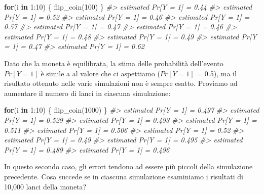 \documentclass[
  11pt,
]{krantz}
\makeatletter
\newenvironment{Shaded}{\begin{snugshade}}{\end{snugshade}}
\newcommand{\CommentTok}[1]{\textcolor[rgb]{0.37,0.37,0.37}{\textit{#1}}}
\newcommand{\ControlFlowTok}[1]{\textcolor[rgb]{0.27,0.27,0.27}{\textbf{#1}}}
\newcommand{\DecValTok}[1]{\textcolor[rgb]{0.06,0.06,0.06}{#1}}
\newcommand{\FunctionTok}[1]{\textcolor[rgb]{0,0,0}{#1}}
\newcommand{\NormalTok}[1]{#1}
\newcommand{\SpecialCharTok}[1]{\textcolor[rgb]{0,0,0}{#1}}
\newenvironment{kframe}{%
\medskip{}
\setlength{\fboxsep}{.8em}
 \def\at@end@of@kframe{}%
 \ifinner\ifhmode%
  \def\at@end@of@kframe{\end{minipage}}%
  \begin{minipage}{\columnwidth}%
 \fi\fi%
 \def\FrameCommand##1{\hskip\@totalleftmargin \hskip-\fboxsep
 \colorbox{shadecolor}{##1}\hskip-\fboxsep
     \hskip-\linewidth \hskip-\@totalleftmargin \hskip\columnwidth}%
 \MakeFramed {\advance\hsize-\width
   \@totalleftmargin\z@ \linewidth\hsize
   \@setminipage}}%
 {\par\unskip\endMakeFramed%
 \at@end@of@kframe}
\renewenvironment{Shaded}{\begin{kframe}}{\end{kframe}}
\theoremstyle{definition}
\theoremstyle{definition}
\theoremstyle{definition}
\theoremstyle{definition}
\theoremstyle{remark}
\makeatother
\begin{document}
\begin{Shaded}
\begin{Highlighting}[]
\ControlFlowTok{for}\NormalTok{(i }\ControlFlowTok{in} \DecValTok{1}\SpecialCharTok{:}\DecValTok{10}\NormalTok{) \{}
  \FunctionTok{flip\_coin}\NormalTok{(}\DecValTok{100}\NormalTok{)}
\NormalTok{\}}
\CommentTok{\#\textgreater{} estimated Pr[Y = 1] = 0.44 }
\CommentTok{\#\textgreater{} estimated Pr[Y = 1] = 0.52 }
\CommentTok{\#\textgreater{} estimated Pr[Y = 1] = 0.46 }
\CommentTok{\#\textgreater{} estimated Pr[Y = 1] = 0.57 }
\CommentTok{\#\textgreater{} estimated Pr[Y = 1] = 0.47 }
\CommentTok{\#\textgreater{} estimated Pr[Y = 1] = 0.46 }
\CommentTok{\#\textgreater{} estimated Pr[Y = 1] = 0.48 }
\CommentTok{\#\textgreater{} estimated Pr[Y = 1] = 0.49 }
\CommentTok{\#\textgreater{} estimated Pr[Y = 1] = 0.47 }
\CommentTok{\#\textgreater{} estimated Pr[Y = 1] = 0.62}
\end{Highlighting}
\end{Shaded}

Dato che la moneta è equilibrata, la stima delle probabilità dell'evento \(Pr[Y = 1]\) è simile a al valore che ci aspettiamo (\(Pr[Y = 1]\) = 0.5), ma il risultato ottenuto nelle varie simulazioni non è sempre esatto. Proviamo ad aumentare il numero di lanci in ciascuna simulazione:

\begin{Shaded}
\begin{Highlighting}[]
\ControlFlowTok{for}\NormalTok{(i }\ControlFlowTok{in} \DecValTok{1}\SpecialCharTok{:}\DecValTok{10}\NormalTok{) \{}
  \FunctionTok{flip\_coin}\NormalTok{(}\DecValTok{1000}\NormalTok{)}
\NormalTok{\}}
\CommentTok{\#\textgreater{} estimated Pr[Y = 1] = 0.497 }
\CommentTok{\#\textgreater{} estimated Pr[Y = 1] = 0.529 }
\CommentTok{\#\textgreater{} estimated Pr[Y = 1] = 0.493 }
\CommentTok{\#\textgreater{} estimated Pr[Y = 1] = 0.511 }
\CommentTok{\#\textgreater{} estimated Pr[Y = 1] = 0.506 }
\CommentTok{\#\textgreater{} estimated Pr[Y = 1] = 0.52 }
\CommentTok{\#\textgreater{} estimated Pr[Y = 1] = 0.49 }
\CommentTok{\#\textgreater{} estimated Pr[Y = 1] = 0.495 }
\CommentTok{\#\textgreater{} estimated Pr[Y = 1] = 0.489 }
\CommentTok{\#\textgreater{} estimated Pr[Y = 1] = 0.496}
\end{Highlighting}
\end{Shaded}

In questo secondo caso, gli errori tendono ad essere più piccoli della simulazione precedente. Cosa succede se in ciascuna simulazione esaminiamo i risultati di 10,000 lanci della moneta?
\end{document}
